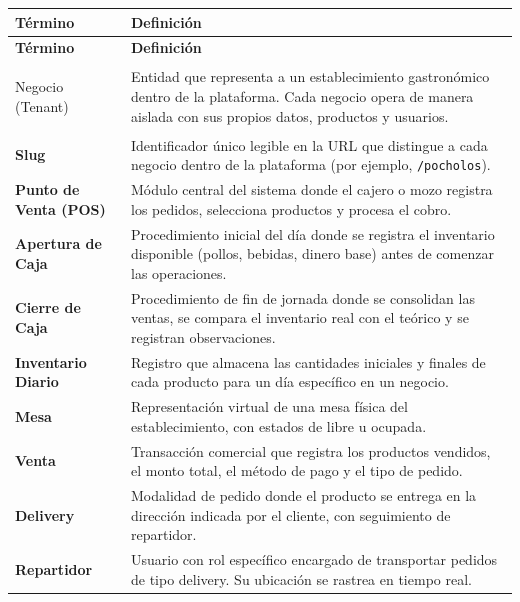 \documentclass[12pt, a4paper]{article}
\begin{document}
\begin{longtable}{>{\bfseries}p{4cm} p{10cm}}
    \toprule
    \textbf{Término} & \textbf{Definición} \\
    \midrule
    \endfirsthead
    \toprule
    \textbf{Término} & \textbf{Definición} \\
    \midrule
    \endhead
    \bottomrule
    \endfoot

    Negocio (Tenant) & Entidad que representa a un establecimiento gastronómico dentro de la plataforma. Cada negocio opera de manera aislada con sus propios datos, productos y usuarios. \\[0.3cm]

    Slug & Identificador único legible en la URL que distingue a cada negocio dentro de la plataforma (por ejemplo, \texttt{/pocholos}). \\[0.3cm]

    Punto de Venta (POS) & Módulo central del sistema donde el cajero o mozo registra los pedidos, selecciona productos y procesa el cobro. \\[0.3cm]

    Apertura de Caja & Procedimiento inicial del día donde se registra el inventario disponible (pollos, bebidas, dinero base) antes de comenzar las operaciones. \\[0.3cm]

    Cierre de Caja & Procedimiento de fin de jornada donde se consolidan las ventas, se compara el inventario real con el teórico y se registran observaciones. \\[0.3cm]

    Inventario Diario & Registro que almacena las cantidades iniciales y finales de cada producto para un día específico en un negocio. \\[0.3cm]

    Mesa & Representación virtual de una mesa física del establecimiento, con estados de libre u ocupada. \\[0.3cm]

    Venta & Transacción comercial que registra los productos vendidos, el monto total, el método de pago y el tipo de pedido. \\[0.3cm]

    Delivery & Modalidad de pedido donde el producto se entrega en la dirección indicada por el cliente, con seguimiento de repartidor. \\[0.3cm]

    Repartidor & Usuario con rol específico encargado de transportar pedidos de tipo delivery. Su ubicación se rastrea en tiempo real. \\[0.3cm]


\end{longtable}
\end{document}
